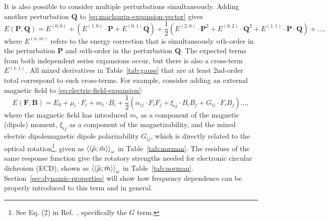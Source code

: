 \documentclass[%
class = book,%
crop = false,%
float = true,%
multi = true,%
preview = false,%
]{standalone}
\begin{document}
It is also possible to consider multiple perturbations simultaneously. Adding another perturbation \(\mathbf{Q}\) to \eqref{eq:maclaurin-expansion-vector} gives
\begin{equation}
  \label{eq:two-perturbation-expansion}
  E(\mathbf{P}, \mathbf{Q}) = E^{(0,0)} + \left(E^{(1,0)} \cdot \mathbf{P} + E^{(0,1)} \mathbf{Q}\right) + \frac{1}{2} \left(E^{(2,0)} \cdot \mathbf{P}^{2} + E^{(0,2)} \cdot \mathbf{Q}^{2} + E^{(1,1)} \cdot \mathbf{P} \cdot \mathbf{Q}\right) + \dots,
\end{equation}
where \(E^{(n,m)}\) refers to the energy correction that is simultaneously \(n\)th-order in the perturbation \(\mathbf{P}\) and \(m\)th-order in the perturbation \(\mathbf{Q}\). The expected terms from both independent series expansions occur, but there is also a cross-term \(E^{(1,1)}\). All mixed derivatives in Table~\ref{tab:gauss} that are at least 2nd-order total correspond to such cross-terms. For example, consider adding an external magnetic field to \eqref{eq:electric-field-expansion}:
\begin{equation}
  \label{eq:electric-and-magnetic-field-expansion}
  E(\mathbf{F}, \mathbf{B}) = E_{0} + \mu_{i} \cdot F_{i} + m_{i} \cdot B_{i} + \frac{1}{2} \left( \alpha_{ij} \cdot F_{i}F_{j} + \xi_{ij} \cdot B_{i}B_{j} + G_{ij} \cdot F_{i}B_{j} \right) \dots,
\end{equation}
where the magnetic field has introduced \(m_{i}\) as a component of the magnetic (dipole) moment, \(\xi_{ij}\) as a component of the magnetizability, and the mixed electric dipole\textendash{}magnetic dipole polarizability \(G_{ij}\), which is directly related to the optical rotation\footnote{See Eq. (2) in Ref.~\parencite{WCMS:WCMS55}, specifically the \(G\) term.}, given as \(\braket{\braket{\hat{\mu};\hat{m}}}_{\omega}\) in Table~\ref{tab:norman}. The residues of the same response function give the rotatory strengths needed for electronic circular dichroism (ECD), shown as \(\braket{\braket{\hat{\mu};\hat{m}}}_{\omega}\) in Table~\ref{tab:norman}. Section~\ref{sec:dynamic-properties} will show how frequency dependence can be properly introduced to this term and in general.

\end{document}
